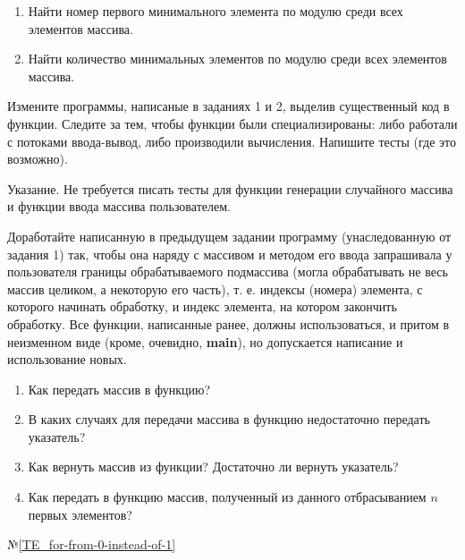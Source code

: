\begin{enumerate}

	\item Найти номер первого минимального элемента по модулю среди всех элементов массива.

	\item Найти количество минимальных элементов по модулю среди всех элементов массива.

\end{enumerate}


\labtask

Измените программы, написаные в заданиях 1 и 2, выделив существенный код в функции.
Следите за тем, чтобы функции были специализированы: либо работали с потоками ввода-вывод, либо производили вычисления.
Напишите тесты (где это возможно).

Указание. Не требуется писать тесты для функции генерации случайного массива и функции ввода массива пользователем. 

\labtask

Доработайте написанную в предыдущем задании программу (унаследованную от задания 1) так, чтобы она наряду с массивом и методом его ввода запрашивала у пользователя границы обрабатываемого подмассива (могла обрабатывать не весь массив целиком, а некоторую его часть), т. е. индексы (номера) элемента, с которого начинать обработку, и индекс элемента, на котором закончить обработку.
Все функции, написанные ранее, должны использоваться, и притом в неизменном виде (кроме, очевидно, \textbf{main}), но допускается написание и использование новых.

\labworkquestions

\begin{enumerate}

	\item
		Как передать массив в функцию?
	\item
		В каких случаях для передачи массива в функцию недостаточно передать указатель?
	\item
		Как вернуть массив из функции? Достаточно ли вернуть указатель?
	\item
		Как передать в функцию массив, полученный из данного отбрасыванием $n$ первых элементов?
\end{enumerate}

\typerrors
№\ref{TE_for-from-0-instead-of-1}%

